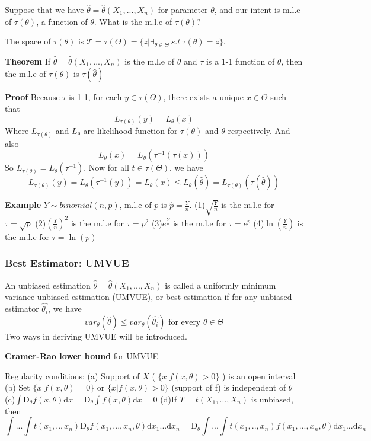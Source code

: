 \documentclass[a4paper,12pt]{article}
\begin{document}
Suppose that we have $\hat{\theta} = \hat{\theta}(X_1, ..., X_n)$ for parameter $\theta$, and our intent is m.l.e of $\tau(\theta)$, a function of $\theta$. What is the m.l.e of $\tau(\theta)$?

The space of $\tau(\theta)$ is $\mathcal{T} = \tau(\Theta) = \{ z | \exists_{\theta\in\Theta}\ s.t\ \tau(\theta) = z\}$. 

\textbf{Theorem} If $\hat{\theta} = \hat{\theta}(X_1, ..., X_n)$ is the m.l.e of $\theta$ and $\tau$ is a 1-1 function of $\theta$, then the m.l.e of $\tau(\theta)$ is $\tau(\hat{\theta})$ 

\textbf{Proof} Because $\tau$ is 1-1, for each $y\in\tau(\Theta)$, there exists a unique $x\in\Theta$ such that
$$L_{\tau(\theta)}(y) = L_{\theta}(x)$$
Where $L_{\tau(\theta)}$ and $L_{\theta}$ are likelihood function for $\tau(\theta)$ and $\theta$ respectively. And also
$$L_{\theta}(x) = L_{\theta}(\tau^{-1}(\tau(x)))$$
So $L_{\tau(\theta)} =  L_{\theta}(\tau^{-1})$. Now for all $t\in\tau(\Theta)$, we have
$$L_{\tau(\theta)}(y) =  L_{\theta}(\tau^{-1}(y)) = L_{\theta}(x) \leq L_{\theta}(\hat{\theta}) = L_{\tau(\theta)}(\tau(\hat{\theta}))$$

\textbf{Example} $Y \sim binomial(n, p)$, m.l.e of $p$ is $\hat{p} = \frac{Y}{n}$. 
(1)$\sqrt{\frac{Y}{n}}$ is the m.l.e for $\tau = \sqrt{p}$ 
(2)$(\frac{Y}{n})^2$ is the m.l.e for $\tau = p^2$ 
(3)$e^{\frac{Y}{n}}$ is the m.l.e for $\tau = e^p$ 
(4)$\ln(\frac{Y}{n})$ is the m.l.e for $\tau = \ln(p)$ 

\subsubsection{Best Estimator: UMVUE}

An unbiased estimation $\hat{\theta} = \hat{\theta}( X_1, ..., X_n )$ is called a uniformly minimum variance unbiased estimation (UMVUE), or best estimation if for any unbiased estimator $\hat{\theta_i}$, we have
$$var_\theta(\hat{\theta}) \leq var_\theta(\hat{\theta_i}) \text{ for every } \theta \in \Theta$$
Two ways in deriving UMVUE will be introduced. 

\textbf{Cramer-Rao lower bound } for UMVUE 

Regularity conditions: 
(a) Support of $X$ ( $\{ x | f(x, \theta) > 0 \}$ ) is an open interval 
(b) Set $\{ x | f(x, \theta) = 0 \}$ or $\{ x | f(x, \theta) > 0 \}$ (support of f) is independent of $\theta$ 
(c)$\int \mathrm{D}_\theta f(x, \theta) \mathrm{d}x = \mathrm{D}_\theta \int f(x, \theta) \mathrm{d}x = 0$ 
(d)If $T = t(X_1, ..., X_n)$ is unbiased, then
$$\int ... \int t(x_1, .., x_n) \mathrm{D}_\theta f(x_1, ..., x_n, \theta) \mathrm{d}x_1...\mathrm{d}x_n = \mathrm{D}_\theta  \int ... \int t(x_1, .., x_n) f(x_1, ..., x_n, \theta) \mathrm{d}x_1...\mathrm{d}x_n $$ 
\end{document}

